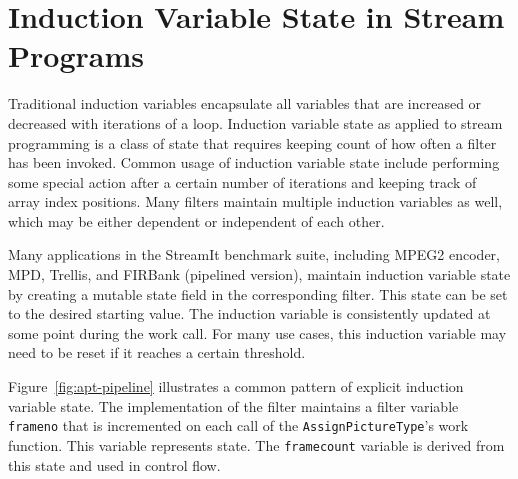 \section{Induction Variable State in Stream Programs}
\label{sec:inductionstate}

  




Traditional induction variables encapsulate all variables that are
increased or decreased with iterations of a loop.  Induction variable
state as applied to stream programming is a class of state that
requires keeping count of how often a filter has been invoked.  Common
usage of induction variable state include performing some special
action after a certain number of iterations and keeping track of array
index positions.  Many filters maintain multiple induction variables
as well, which may be either dependent or independent of each other.

Many applications in the StreamIt benchmark suite, including MPEG2 encoder,
MPD, Trellis, and FIRBank (pipelined version), maintain induction variable state 
by creating a mutable state field in the corresponding filter.  This
state can be set to the desired starting value.  The induction
variable is consistently updated at some point during the work call.
For many use cases, this induction variable may need to be reset if it
reaches a certain threshold. 

Figure~\ref{fig:apt-pipeline} illustrates a common pattern of explicit
induction variable state.  The implementation of the filter maintains
a filter variable {\tt frameno} that is incremented on each call of
the {\tt AssignPictureType}'s work function.  This variable
represents state.  The {\tt framecount} variable is derived
from this state and used in control flow.

